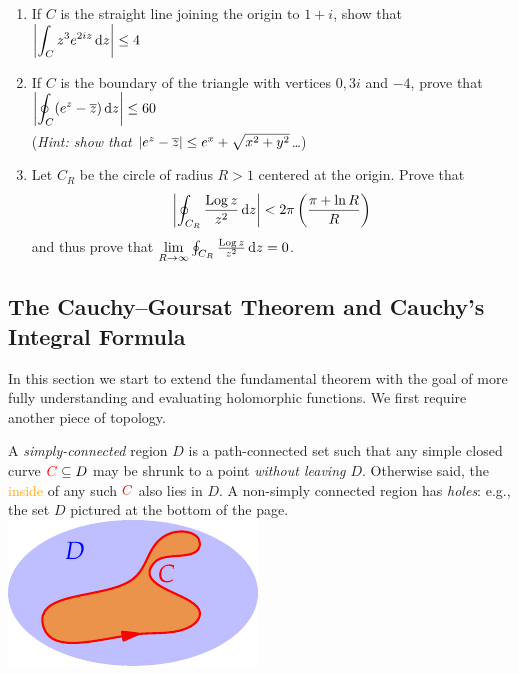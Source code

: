 \begin{exercises}
\begin{enumerate}
	  
	  \item If $C$ is the straight line joining the origin to $1+i$, show that $\displaystyle\left| \int_C z^3e^{2iz}\,{\mathrm{d} z}\right|\le 4$
	
	
		\item If $C$ is the boundary of the triangle with vertices $0,3i$ and $-4$, prove that $\displaystyle\smash[b]{\left| \oint_C(e^z-\overline{z})\,{\mathrm{d} z}\right|}\le 60$\par
		(\emph{Hint: show that $\left| e^z-\overline{z}\right|\le e^x+\sqrt{x^2+y^2}$\ldots})
		
		
		\item Let $C_R$ be the circle of radius $R>1$ centered at the origin. Prove that 
		\[
			\left| \oint_{C_R}\frac{\operatorname{Log} z}{z^2}\,{\mathrm{d} z}\right| <2\pi\left(\frac{\pi +\ln R}R\right)
		\]
		and thus prove that $\lim\limits_{R\to\infty}\oint_{C_R}\frac{\operatorname{Log} z}{z^2}\,{\mathrm{d} z}=0$.
		
	\end{enumerate}
\end{exercises}

\clearpage



\subsection[Cauchy--Goursat \& the Integral Formula]{The Cauchy--Goursat Theorem and Cauchy's Integral Formula}

In this section we start to extend the fundamental theorem with the goal of more fully understanding and evaluating holomorphic functions. We first require another piece of topology.

\begin{defn}[lower separated=false, sidebyside, sidebyside align=top seam, sidebyside gap=0pt, righthand width=0.27\linewidth]{}{}
	A \emph{simply-connected} region $D$ is a path-connected set such that any simple closed curve $\textcolor{red}{C}\subseteq D$ may be shrunk to a point \emph{without leaving $D$}. Otherwise said, the  \textcolor{orange}{inside} of any such $\textcolor{red}{C}$ also lies in $D$.\smallbreak
	A non-simply connected region has \emph{holes}: e.g., the set $D$ pictured at the bottom of the page.
	\tcblower
	\flushright\includegraphics[scale=0.95]{simplyconnected}
\end{defn}

